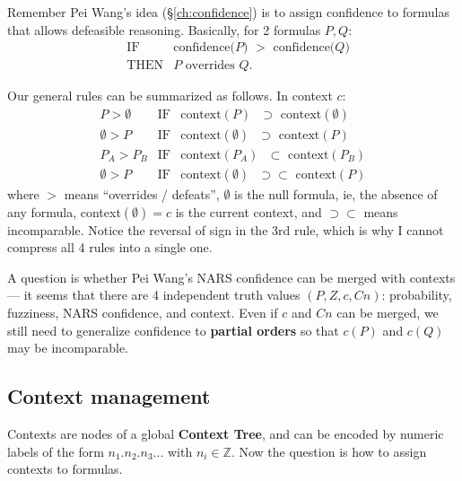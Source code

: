 Remember Pei Wang's idea (\S\ref{ch:confidence}) is to assign confidence to formulas that allows defeasible reasoning.  Basically, for 2 formulas $P, Q$:
\begin{eqnarray}
& \mbox{IF} & \mbox{confidence($P$) $>$ confidence($Q$)} \nonumber\\
& \mbox{THEN} & \mbox{$P$ overrides $Q$}. \nonumber
\end{eqnarray}

Our general rules can be summarized as follows.  In context $c$:
\begin{eqnarray}
P > \emptyset & \mbox{IF} & \mbox{context$(P)$ $\supset$ context$(\emptyset)$} \nonumber\\
\emptyset > P & \mbox{IF} & \mbox{context$(\emptyset)$ $\supset$ context$(P)$} \\
P_A > P_B & \mbox{IF} & \mbox{context$(P_A)$ $\subset$ context$(P_B)$} \nonumber\\
\emptyset > P & \mbox{IF} & \mbox{context$(\emptyset)$ $\supset\subset$ context$(P)$} \nonumber
\end{eqnarray}
where $>$ means ``overrides / defeats'', $\emptyset$ is the null formula, ie, the absence of any formula, context$(\emptyset) = c$ is the current context, and $\supset\subset$ means incomparable.  Notice the reversal of sign in the 3rd rule, which is why I cannot compress all 4 rules into a single one.

A question is whether Pei Wang's NARS confidence can be merged with contexts --- it seems that there are 4 independent truth values $(P, Z, c, Cn)$: probability, fuzziness, NARS confidence, and context.  Even if $c$ and $Cn$ can be merged, we still need to generalize confidence to \textbf{partial orders} so that $c(P)$ and $c(Q)$ may be incomparable.


\subsection{Context management}

Contexts are nodes of a global \textbf{Context Tree}, and can be encoded by numeric labels of the form $n_1.n_2.n_3...$ with $n_i \in \mathbb{Z}$.  Now the question is how to assign contexts to formulas.

